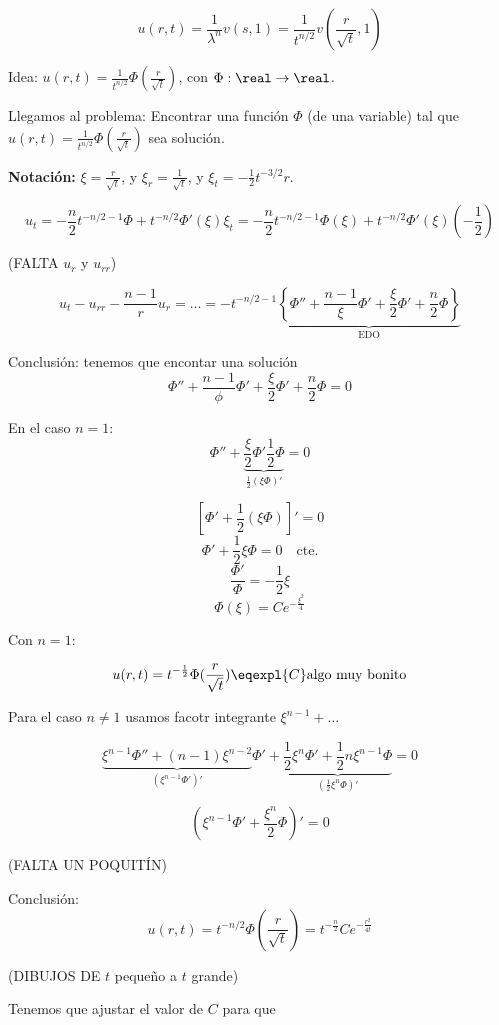 		\[ u(r,t) = \frac{1}{\lambda^n} v(s,1) = \frac{1}{t^{n/2}} v(\frac{r}{\sqrt{t}},1)\]

		Idea: $u(r,t) = \frac{1}{t^{n/2}} \Phi(\frac{r}{\sqrt{t}})$, con $\Phi: \real \rightarrow \real$.

		Llegamos al problema: Encontrar una función $\Phi$ (de una variable) tal que $u(r,t) = \frac{1}{t^{n/2}} \Phi(\frac{r}{\sqrt{t}})$ sea solución.

		\textbf{Notación: } $\xi = \frac{r}{\sqrt{t}}$, y $\xi_r = \frac{1}{\sqrt{t}}$, y $\xi_t = -\frac{1}{2} t^{-3/2} r$.

		\[ u_t = - \frac{n}{2} t^{-n/2-1} \Phi + t^{-n/2} \Phi' (\xi) \xi_t = -\frac{n}{2} t^{-n/2 - 1} \Phi(\xi) + t^{-n/2} \Phi'(\xi) (-\frac{1}{2}) \]

		(FALTA $u_r$ y $u_{rr}$)

		\[ u_t - u_{rr} - \frac{n-1}{r}u_r = … = - t^{-n/2 - 1} \underbrace{\left\{ \Phi'' + \frac{n-1}{\xi}\Phi' + \frac{\xi}{2}\Phi' + \frac{n}{2}\Phi \right\}}_{\text{EDO}} \]

		Conclusión: tenemos que encontar una solución
		\[ \Phi'' + \frac{n-1}{\phi} \Phi'+ \frac{\xi}{2}\Phi' + \frac{n}{2}\Phi = 0\]

		En el caso $n = 1$:
		\[ \Phi'' + \underbrace{\frac{\xi}{2}\Phi' \frac{1}{2}\Phi}_{\frac{1}{2} (\xi \Phi)'} = 0\]

		\[ \left[ \Phi' + \frac{1}{2} (\xi \Phi)  \right]' = 0\]
		\[ \Phi' + \frac{1}{2} \xi \Phi = 0 \quad \text{cte.}\]
		\[ \frac{\Phi'}{\Phi} = -\frac{1}{2} \xi\]
		\[ \Phi(\xi) = C e^{-\frac{\xi^2}{4}}\]

		Con $n=1$:

		\[ u(r,t) = t^{-\frac{1}{2}} \Phi(\frac{r}{\sqrt{t}}) \eqexpl{C}  \text{algo muy bonito}\]

		Para el caso $n \neq 1$ usamos facotr integrante $\xi^{n-1} + …$

		\[ \underbrace{\xi^{n-1} \Phi'' + (n-1) \xi^{n-2}}_{(\xi^{n-1}\Phi')'} \Phi' + \underbrace{\frac{1}{2}\xi^n \Phi' + \frac{1}{2} n \xi^{n-1} \Phi}_{(\frac{1}{2} \xi^n \Phi)'} = 0 \]

		\[ (\xi^{n-1} \Phi' + \frac{\xi^n}{2}\Phi)' = 0\]

		(FALTA UN POQUITÍN)

		Conclusión:
			\[ u(r,t) = t^{-n/2} \Phi(\frac{r}{\sqrt{t}}) = t^{-\frac{n}{2}} C e^{-\frac{r^2}{4t}} \]

		(DIBUJOS DE $t$ pequeño a $t$ grande)


		Tenemos que ajustar el valor de $C$ para que

